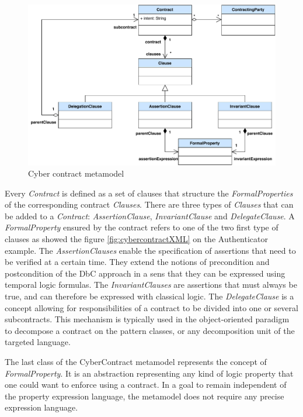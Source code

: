 \begin{figure}
    \centering
    \includegraphics[width=1\columnwidth]{utils/Contract_MM.pdf}
    \caption{Cyber contract metamodel}
    \label{fig:CybercontractMetamodel}
\end{figure}

Every \textit{Contract} is defined as a set of clauses that structure the \textit{FormalProperties} of the corresponding contract \textit{Clauses}. There are three types of \textit{Clauses} that can be added to a \textit{Contract}: \textit{AssertionClause}, \textit{InvariantClause} and \textit{DelegateClause}. 
A \textit{FormalProperty} ensured by the contract refers to one of the two first type of clauses as showed the figure \ref{fig:cybercontractXML} on the Authenticator example.
The \textit{AssertionClauses} enable the specification of assertions that need to be verified at a certain time. They extend the notions of precondition and postcondition of the DbC approach  in a sens that they can be expressed using temporal logic formulas. The \textit{InvariantClauses} are assertions that must always be true, and can therefore be expressed with classical logic. The \textit{DelegateClause} is a concept allowing for responsibilities of a contract to be divided into one or several subcontracts. This mechanism is typically used in the object-oriented paradigm to decompose a contract on the pattern classes, or any decomposition unit of the targeted language.

The last class of the CyberContract metamodel represents the concept of \textit{FormalProperty}. It is an abstraction representing any kind of logic property that one could want to enforce using a contract. In a goal to remain independent of the property expression language, the metamodel does not require any precise expression language.


